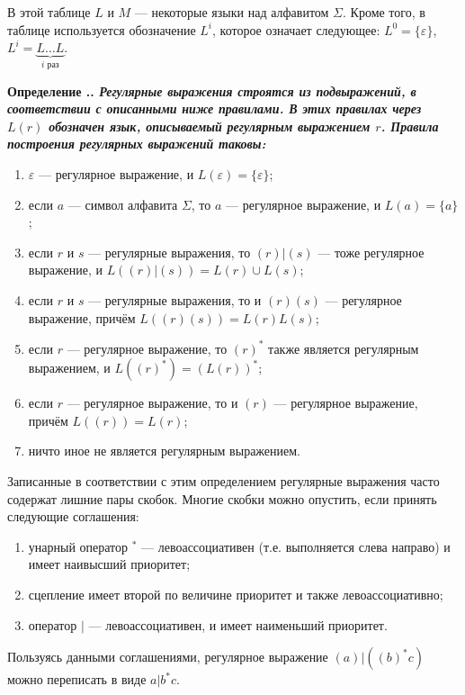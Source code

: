 \documentclass[10pt]{report}
\newcounter{defin}[section]
\renewcommand{\thedefin}{\thesection.\arabic{defin}}
\newenvironment{Definition}{\par\refstepcounter{defin}\bf Определение \thedefin.\sl}{\rm\par}
\begin{document}
В этой таблице  $L$ и $M$ --- некоторые языки над алфавитом $\Sigma$. Кроме того, в таблице используется обозначение $L^i$, которое означает следующее: $L^0=\{\varepsilon\}$,
$L^i=\underbrace{L\dots L}_{\text{$i$ раз}}$.

\begin{Definition}
    Регулярные выражения строятся из подвыражений, в соответствии с описанными ниже правилами. В этих правилах через $L(r)$ обозначен язык, описываемый регулярным выражением
    $r$. Правила    построения регулярных выражений таковы:
    \begin{enumerate}
        \item $\varepsilon$ --- регулярное выражение, и $L(\varepsilon)=\{\varepsilon\}$;
        \item если $a$ --- символ алфавита $\Sigma$, то $a$ --- регулярное выражение, и $L(a)=\{a\}$;
        \item если $r$ и $s$ --- регулярные выражения, то $(r)|(s)$ --- тоже регулярное выражение, и $L((r)|(s))=L(r)\cup L(s)$;
        \item если $r$ и $s$ --- регулярные выражения, то и $(r)(s)$ --- регулярное выражение, причём $L((r)(s))=L(r)L(s)$;
        \item если $r$ --- регулярное выражение, то $(r)^*$ также является регулярным выражением, и $L((r)^*)=(L(r))^*$;
        \item если $r$ --- регулярное выражение, то и $(r)$ --- регулярное выражение, причём $L((r))=L(r)$;
        \item ничто иное не является регулярным выражением.
    \end{enumerate}
\end{Definition}

Записанные в соответствии с этим определением регулярные выражения часто содержат лишние пары скобок. Многие скобки можно опустить, если принять следующие соглашения:
\begin{enumerate}
    \item унарный оператор ${}^*$ --- левоассоциативен (т.е. выполняется слева направо) и имеет наивысший приоритет;
    \item сцепление имеет второй по величине приоритет и также левоассоциативно;
    \item оператор $|$ --- левоассоциативен, и имеет наименьший приоритет.
\end{enumerate}
\noindent%
Пользуясь данными соглашениями, регулярное выражение $(a)|((b)^*c)$ можно переписать в виде $a|b^*c$.
\end{document}
